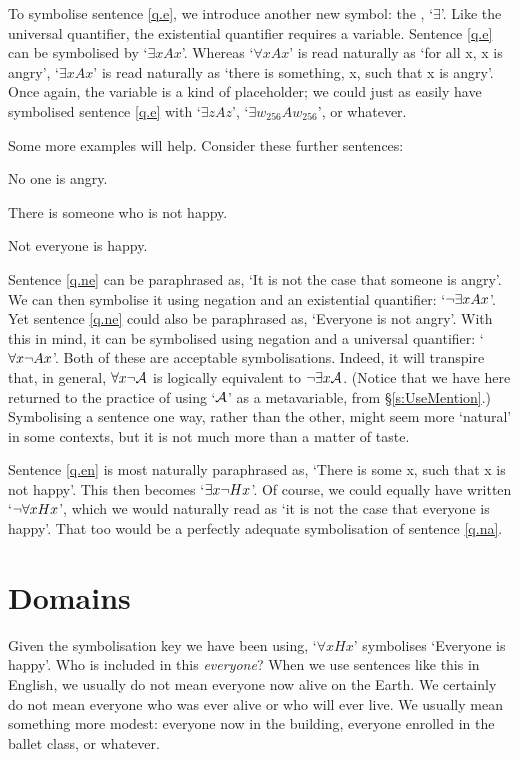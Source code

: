 To symbolise sentence \ref{q.e}, we introduce another new symbol: the , `$\exists$'. Like the universal quantifier, the existential quantifier requires a variable. Sentence \ref{q.e} can be symbolised by `$\exists x Ax$'. Whereas `$\forall x Ax$' is read naturally as `for all x, x is angry', `$\exists x Ax$' is read naturally as `there is something, x, such that x is angry'. Once again, the variable is a kind of placeholder; we could just as easily have symbolised sentence \ref{q.e} with `$\exists z Az$', `$\exists w_{256} Aw_{256}$', or whatever.


Some more examples will help. Consider these further sentences:
	\begin{earg}
		\item[\ex{q.ne}] No one is angry.
		\item[\ex{q.en}] There is someone who is not happy.
		\item[\ex{q.na}] Not everyone is happy.
	\end{earg}
Sentence \ref{q.ne} can be paraphrased as, `It is not the case that someone is angry'. We can then symbolise it using negation and an existential quantifier: `$\neg \exists x Ax$'. Yet sentence \ref{q.ne} could also be paraphrased as, `Everyone is not angry'. With this in mind, it can be symbolised using negation and a universal quantifier: `$\forall x \neg Ax$'. Both of these are acceptable symbolisations.  Indeed, it will transpire that, in general, $\forall x \neg\mathcal{A}$ is logically equivalent to $\neg\exists x\mathcal{A}$. (Notice that we have here returned to the practice of using `$\mathcal{A}$' as a metavariable, from \S\ref{s:UseMention}.) Symbolising a sentence one way, rather than the other, might seem more `natural' in some contexts, but it is not much more than a matter of taste.

Sentence \ref{q.en} is most naturally paraphrased as, `There is some x, such that x is not happy'. This then becomes `$\exists x \neg Hx$'. Of course, we could equally have written `$\neg\forall x Hx$', which we would naturally read as `it is not the case that everyone is happy'. That too would be a perfectly adequate symbolisation of sentence \ref{q.na}.


\section{Domains}
Given the symbolisation key we have been using, `$\forall xHx$' symbolises `Everyone is happy'.  Who is included in this \emph{everyone}? When we use sentences like this in English, we usually do not mean everyone now alive on the Earth. We certainly do not mean everyone who was ever alive or who will ever live. We usually mean something more modest: everyone now in the building, everyone enrolled in the ballet class, or whatever.

